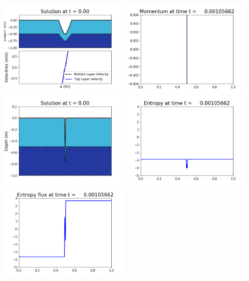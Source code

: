 \documentclass[11pt]{article}
\begin{document}
\includegraphics[width=0.475\textwidth]{frame0004fig1002.png}
\vskip 10pt 
\includegraphics[width=0.475\textwidth]{frame0004fig1003.png}
\includegraphics[width=0.475\textwidth]{frame0004fig1006.png}
\vskip 10pt 
\includegraphics[width=0.475\textwidth]{frame0004fig1007.png}
\includegraphics[width=0.475\textwidth]{frame0004fig1008.png}
\end{document}
